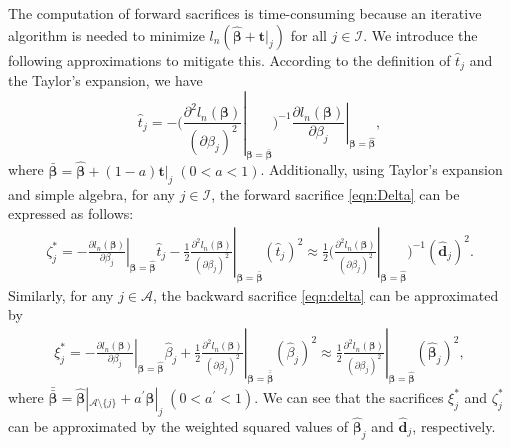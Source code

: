 The computation of forward sacrifices is time-consuming because an iterative algorithm is needed to minimize $l_n(\hat{\boldsymbol \beta} + {\boldsymbol t} |_{j})$ for all $j \in \mathcal{I}$.
We introduce the following approximations to mitigate this.
According to the definition of $\hat{t}_j$ and the Taylor's expansion, we have
$$\hat{t}_j = -\Big( \left.\frac{\partial^2 l_n( \boldsymbol \beta )}{ (\partial \beta_{j} )^2 }\right|_{\boldsymbol \beta = \bar{\boldsymbol \beta} } \Big)^{-1} \left.\frac{\partial l_n( \boldsymbol \beta )}{\partial \beta_{j}}\right|_{\boldsymbol \beta = \hat{ \boldsymbol\beta} },$$
where $\bar{\boldsymbol \beta} = \hat{\boldsymbol \beta} + (1 - a) \boldsymbol t|_j \; (0 < a < 1)$.
Additionally, using Taylor's expansion and simple algebra, for any $j\in \mathcal{I}$, the forward sacrifice \eqref{eqn:Delta} can be expressed as follows:
\begin{align*}
\zeta^*_j
= - \left.\frac{\partial l_n( \boldsymbol \beta )}{\partial \beta_{j}}\right|_{\boldsymbol \beta = \hat{\boldsymbol \beta} } \hat{t}_j - \frac{1}{2}\left.\frac{\partial^2 l_n( \boldsymbol \beta )}{ (\partial \beta_{j} )^2 }\right|_{\boldsymbol \beta = \bar{\boldsymbol \beta}} (\hat{t}_j)^2
\approx \frac{1}{2}\Big( \left.\frac{\partial^2 l_n( \boldsymbol \beta )}{ (\partial \beta_{j} )^2 }\right|_{\boldsymbol \beta = \hat{\boldsymbol \beta} } \Big)^{-1} ( \hat{\boldsymbol d}_j )^2.
\end{align*}
Similarly, for any $j\in \mathcal{A}$, the backward sacrifice \eqref{eqn:delta} can be approximated by
\begin{align*}
\xi^*_j
= - \left.\frac{\partial l_n( \boldsymbol\beta )}{\partial \beta_{j}}\right|_{\boldsymbol \beta = \hat{\boldsymbol\beta} } \hat \beta_j + \frac{1}{2}\left.\frac{\partial^2 l_n( \boldsymbol \beta )}{ (\partial \beta_{j})^2 }\right|_{\boldsymbol \beta = \bar{\bar{\boldsymbol\beta} }} (\hat\beta_j)^2
\approx \frac{1}{2}\left.\frac{\partial^2 l_n( \boldsymbol \beta )}{ (\partial \beta_{j})^2 }\right|_{\boldsymbol \beta = \hat{\boldsymbol \beta}} (\hat {\boldsymbol \beta}_j)^2,
\end{align*}
where $\bar{\bar{\boldsymbol \beta} }= \hat{\boldsymbol \beta}|_{\mathcal{A} \setminus \{j\} } + a^\prime \hat{\boldsymbol \beta} |_j \; (0 < a^\prime < 1).$
We can see that the sacrifices $\xi^*_j$ and $\zeta^*_j$ can be approximated by the weighted squared values of $\hat{\boldsymbol \beta}_{j}$ and $\hat{\boldsymbol d}_{j}$, respectively.
